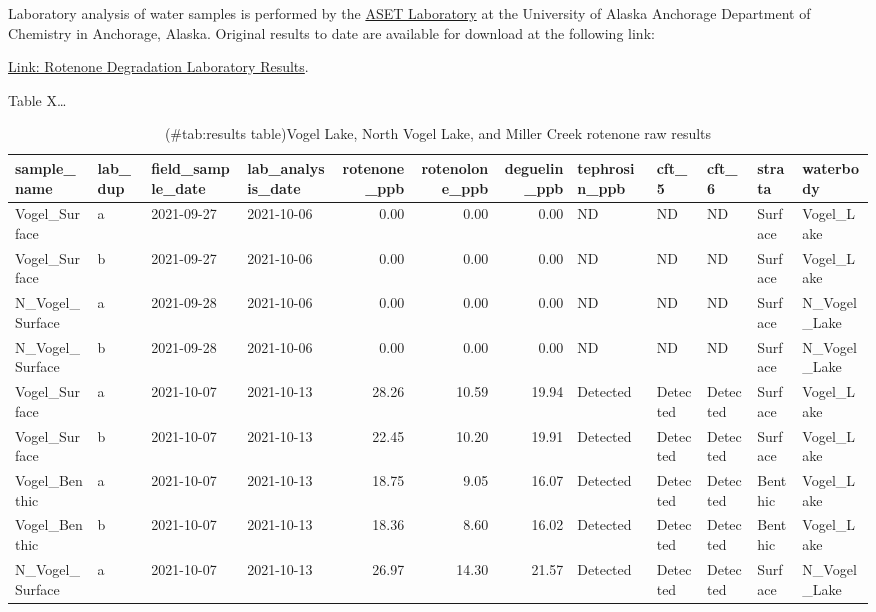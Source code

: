 \documentclass[
]{book}
\begin{document}
Laboratory analysis of water samples is performed by the \href{https://www.uaa.alaska.edu/academics/college-of-arts-and-sciences/departments/chemistry/aset_lab/}{ASET Laboratory} at the University of Alaska Anchorage Department of Chemistry in Anchorage, Alaska. Original results to date are available for download at the following link:

\href{https://github.com/Kenai-Watershed-Forum/Miller_Creek_Vogel_Lake_WQX/tree/main/input/rotenone_data}{Link: Rotenone Degradation Laboratory Results}.

Table X\ldots{}

\begin{table}

\caption{(\#tab:results table)Vogel Lake, North Vogel Lake, and Miller Creek rotenone raw results}
\centering
\begin{tabular}[t]{l|l|l|l|r|r|r|l|l|l|l|l}
\hline
sample\_name & lab\_dup & field\_sample\_date & lab\_analysis\_date & rotenone\_ppb & rotenolone\_ppb & deguelin\_ppb & tephrosin\_ppb & cft\_5 & cft\_6 & strata & waterbody\\
\hline
Vogel\_Surface & a & 2021-09-27 & 2021-10-06 & 0.00 & 0.00 & 0.00 & ND & ND & ND & Surface & Vogel\_Lake\\
\hline
Vogel\_Surface & b & 2021-09-27 & 2021-10-06 & 0.00 & 0.00 & 0.00 & ND & ND & ND & Surface & Vogel\_Lake\\
\hline
N\_Vogel\_Surface & a & 2021-09-28 & 2021-10-06 & 0.00 & 0.00 & 0.00 & ND & ND & ND & Surface & N\_Vogel\_Lake\\
\hline
N\_Vogel\_Surface & b & 2021-09-28 & 2021-10-06 & 0.00 & 0.00 & 0.00 & ND & ND & ND & Surface & N\_Vogel\_Lake\\
\hline
Vogel\_Surface & a & 2021-10-07 & 2021-10-13 & 28.26 & 10.59 & 19.94 & Detected & Detected & Detected & Surface & Vogel\_Lake\\
\hline
Vogel\_Surface & b & 2021-10-07 & 2021-10-13 & 22.45 & 10.20 & 19.91 & Detected & Detected & Detected & Surface & Vogel\_Lake\\
\hline
Vogel\_Benthic & a & 2021-10-07 & 2021-10-13 & 18.75 & 9.05 & 16.07 & Detected & Detected & Detected & Benthic & Vogel\_Lake\\
\hline
Vogel\_Benthic & b & 2021-10-07 & 2021-10-13 & 18.36 & 8.60 & 16.02 & Detected & Detected & Detected & Benthic & Vogel\_Lake\\
\hline
N\_Vogel\_Surface & a & 2021-10-07 & 2021-10-13 & 26.97 & 14.30 & 21.57 & Detected & Detected & Detected & Surface & N\_Vogel\_Lake\\

\end{tabular}
\end{table}
\end{document}
